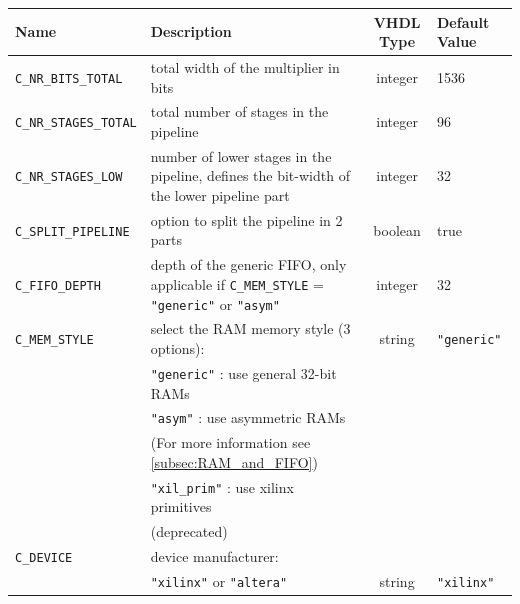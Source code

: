 \begin{center}
	\begin{tabular}{|l|p{6.5cm}|c|l|}
		\hline
		\rowcolor{Gray}
		\textbf{Name} & \textbf{Description} & \textbf{VHDL Type} &\textbf{Default Value} \bigstrut\\
		\hline
		\verb|C_NR_BITS_TOTAL| & total width of the multiplier in bits & integer & 1536\bigstrut\\
		\hline
		\verb|C_NR_STAGES_TOTAL| & total number of stages in the pipeline & integer & 96\bigstrut\\
		\hline
		\verb|C_NR_STAGES_LOW| & number of lower stages in the pipeline, defines the bit-width of the lower pipeline part & integer & 32 \bigstrut\\
		\hline
		\verb|C_SPLIT_PIPELINE| & option to split the pipeline in 2 parts & boolean & true \bigstrut\\
		\hline
		\verb|C_FIFO_DEPTH| & depth of the generic FIFO, only applicable if \verb|C_MEM_STYLE| = \verb|"generic"| or \verb|"asym"|  & integer & 32 \bigstrut\\
		\hline
		\verb|C_MEM_STYLE| & select the RAM memory style (3 options): & string & \verb|"generic"| \bigstrut\\
							& \verb|"generic"| : use general 32-bit RAMs & & \\
      						& \verb|"asym"| : use asymmetric RAMs & & \\
      						& (For more information see \ref{subsec:RAM_and_FIFO}) & & \\
      						& \verb|"xil_prim"| : use xilinx primitives & &\\
      						& (deprecated) & & \bigstrut[b] \\
		\hline
		\verb|C_DEVICE| & device manufacturer: & & \\
						& \verb|"xilinx"| or \verb|"altera"| & string & \verb|"xilinx"| \bigstrut\\
		\hline
	\end{tabular}%
\end{center}

